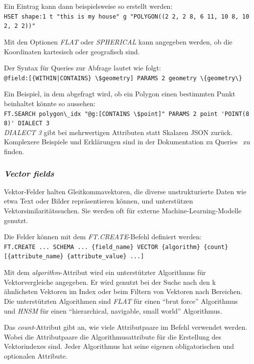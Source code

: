 Ein Eintrag kann dann beispielsweise so erstellt werden:\\
\lstinline|HSET shape:1 t "this is my house" g "POLYGON((2 2, 2 8, 6 11, 10 8, 10 2, 2 2))"|


Mit den Optionen \emph{FLAT} oder \emph{SPHERICAL} kann angegeben werden, ob die Koordinaten kartesisch  oder  geografisch sind.

Der Syntax für Queries zur Abfrage lautet wie folgt:\\
\lstinline+@field:[{WITHIN|CONTAINS} \$geometry] PARAMS 2 geometry \{geometry\}+

Ein Beispiel, in dem abgefragt wird, ob ein Polygon einen bestimmten Punkt beinhaltet könnte so aussehen:\\
\lstinline|FT.SEARCH polygon\_idx "@g:[CONTAINS \$point]" PARAMS 2 point 'POINT(8 8)' DIALECT 3|\\
\emph{DIALECT 3} gibt bei mehrwertigen Attributen statt Skalaren JSON zurück.
Komplexere Beispiele und Erklärungen sind in der Dokumentation zu Queries~\cite{redis_ltd_query_nodate} zu finden.


\subsubsection{\emph{Vector fields}} Vektor-Felder halten Gleitkommavektoren, die diverse unstrukturierte Daten wie etwa Text oder Bilder repräsentieren können, und unterstützen Vektorsimilaritätssuchen. Sie werden oft für externe Machine-Learning-Modelle genutzt.

Die Felder können mit dem \emph{FT.CREATE}-Befehl definiert werden:\\
\lstinline|FT.CREATE ... SCHEMA ... {field_name} VECTOR {algorithm} {count} |\\
\lstinline|[{attribute_name} {attribute_value} ...]|

Mit dem \emph{algorithm}-Attribut wird ein unterstützter Algorithmus für Vektorvergleiche angegeben. Er wird genutzt bei der Suche nach den k ähnlichsten Vektoren im Index oder beim Filtern von Vektoren nach Bereichen. Die unterstützten Algorithmen sind \emph{FLAT} für einen \enquote{brut force} Algorithmus und \emph{HNSM} für einen \enquote{hierarchical, navigable, small world} Algorithmus.

Das \emph{count}-Attribut gibt an, wie viele Attributpaare im Befehl verwendet werden. Wobei die Attributpaare die Algorithmusattribute für die Erstellung des Vektorindexes sind. Jeder Algorithmus hat seine eigenen obligatorischen und optionalen Attribute.

